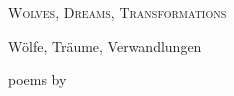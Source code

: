 
\vspace*{5em}

{\raggedright

{\Large\chapTitleFont\scshape
Wolves, Dreams, Transformations
\vspace*{0.5\onelineskip}

Wölfe, Träume, Verwandlungen}

\vfill

poems by\\
\theauthor

}
